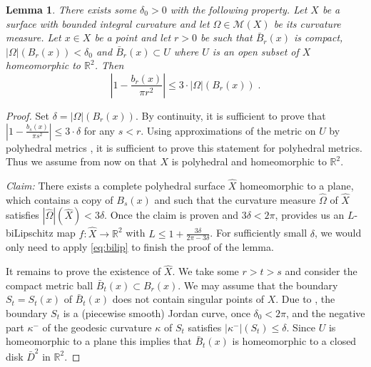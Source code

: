 \documentclass[12pt,leqno]{amsart}
\numberwithin{equation}{section}
\newtheorem{lem}[thm]{Lemma}
\theoremstyle{definition}
\theoremstyle{remark}
\newcommand{\R}{\mathbb{R}}
\begin{document}
\begin{lem} \label{lem:bl}
There exists some $\delta _0>0$ with the following property.
Let $X$ be a surface with bounded integral curvature and let  $\Omega\in \mathcal M(X)$ be its   curvature measure. Let $x\in X$ be a point and let $r>0$ be such that
$\bar B_{r} (x)$ is compact,  $| \Omega| ( B_{r} (x) )  < \delta _0$ and $\bar B_{r} (x)\subset U$ where $U$ is an open subset of $X$ homeomorphic to $\R^2$.
Then $$|1- \frac {b_r(x)}  {\pi r^2} | \leq 3 \cdot |\Omega |( B_{r} (x)) \; .$$
\end{lem}


\begin{proof}
Set $\delta = |\Omega |( B_{r} (x))$. By continuity, it is sufficient to prove that $|1- \frac {b_s(x)}  {\pi s^2}| \leq 3 \cdot \delta $ for any $s<r$.  Using approximations of
the metric on $U$ by polyhedral metrics \cite[Theorem 8.4.3, Theorem 8.1.9]{Reshetnyak-GeomIV},  it is sufficient to prove this  statement for polyhedral metrics. Thus we assume from now on that $X$ is polyhedral  and homeomorphic to $\R^2$.

\emph{Claim:} There exists a complete polyhedral surface $\hat X$ homeomorphic to a plane,  which contains a copy of $B_s (x)$ and such that
the curvature measure $\hat \Omega$ of $\hat X$  satisfies $|\hat \Omega | (\hat X) < 3\delta$.  Once the claim is proven  and $3\delta < 2\pi$,
\cite{Bonk-Lang} provides us an $L$-biLipschitz map $f:\hat X\to \R^2$ with $L\leq 1+\frac {3\delta} {2\pi -3\delta}$.
For sufficiently small $\delta$, we would only need to apply \eqref{eq:bilip} to finish the proof of the lemma.

It remains to prove the existence of $\hat X$. We take some $r>t>s$ and consider the compact  metric ball $\bar B_t (x) \subset B_r (x)$. We may assume that  the boundary $S_t=S_t (x)$ of
$\bar B_t (x)$ does not contain singular points of $X$. Due to \cite[Theorem 9.1, Theorem 9.3] {Reshetnyak-GeomIV}, the boundary $S_t$ is a (piecewise smooth) Jordan curve, once $\delta _0< 2\pi$, and the negative part $\kappa ^-$ of the geodesic curvature $\kappa$ of $S_t$  satisfies $|\kappa ^-| (S_t)  \leq \delta$.  Since $U$ is homeomorphic to a plane this implies that $\bar B_t (x)$ is homeomorphic to a closed disk $\bar D^2$ in $\R^2$.



\end{proof}
\end{document}
